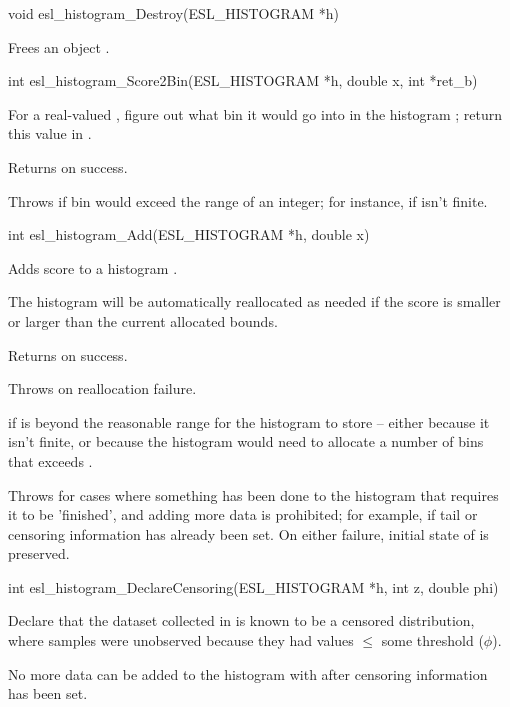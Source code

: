 \begin{sreapi}
\hypertarget{func:esl_histogram_Destroy()}
{\item[void esl\_histogram\_Destroy(ESL\_HISTOGRAM *h)]}

Frees an  object .


\hypertarget{func:esl_histogram_Score2Bin()}
{\item[int esl\_histogram\_Score2Bin(ESL\_HISTOGRAM *h, double x, int *ret\_b)]}

For a real-valued , figure out what bin it would
go into in the histogram ; return this value in
.

Returns  on success.

Throws  if bin  would exceed the range of
an integer; for instance, if  isn't finite.



\hypertarget{func:esl_histogram_Add()}
{\item[int esl\_histogram\_Add(ESL\_HISTOGRAM *h, double x)]}

Adds score  to a histogram .

The histogram will be automatically reallocated as
needed if the score is smaller or larger than the
current allocated bounds.  

Returns  on success.

Throws  on reallocation failure.

 if  is beyond the reasonable range for
the histogram to store -- either because it isn't finite,
or because the histogram would need to allocate a number
of bins that exceeds .

Throws  for cases where something has been done
to the histogram that requires it to be 'finished', and
adding more data is prohibited; for example, 
if tail or censoring information has already been set.
On either failure, initial state of  is preserved.


\hypertarget{func:esl_histogram_DeclareCensoring()}
{\item[int esl\_histogram\_DeclareCensoring(ESL\_HISTOGRAM *h, int z, double phi)]}

Declare that the dataset collected in  is known to be a
censored distribution, where  samples were unobserved because
they had values $\leq$ some threshold  ($\phi$).

No more data can be added to the histogram with 
after censoring information has been set.


\end{sreapi}
